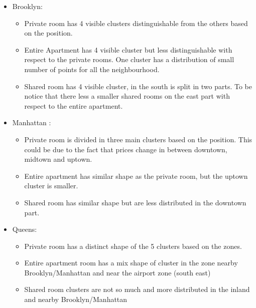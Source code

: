 \documentclass{FR16}
\begin{document}
\begin{itemize}
\itemsep0em 
\item Brooklyn: 
\begin{itemize}
\itemsep0em 
\item Private room has 4 visible clusters distinguishable from the others based on the position.
\item Entire Apartment has 4 visible cluster but less distinguishable with respect to the private rooms. One cluster has a distribution of small number of points for all the neighbourhood.
\item Shared room has 4 visible cluster, in the south is split in two parts. To be notice that there less a smaller shared rooms on the east part with respect to the entire apartment.
\end{itemize} 
\item Manhattan :
\begin{itemize}
\itemsep0em 
\item Private room is divided in three main clusters based on the position. This could be due to the fact that prices change in between downtown, midtown and uptown.
\item Entire apartment has similar shape as the private room, but the uptown cluster is smaller.
\item Shared room has similar shape but are less distributed in the downtown part. 
\end{itemize}

\item Queens:
\begin{itemize}
\itemsep0em 
\item Private room has a distinct shape of the 5 clusters based on the zones. 
\item Entire apartment room  has a mix shape of cluster in the zone nearby Brooklyn/Manhattan and near the airport zone (south east) 
\item Shared room clusters are not so much and more distributed in the inland and nearby Brooklyn/Manhattan 
\end{itemize}



\end{itemize}
\end{document}
